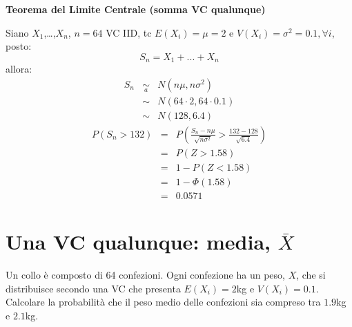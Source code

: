 \documentclass[
  11pt,
]{book}
\theoremstyle{mytheoremstyle}
\theoremstyle{mydefstyle}
\newenvironment{sol}
  {
  \begin{tcolorbox}[enhanced,breakable,arc=0.1mm,boxrule=1pt,colback=white,colframe=iblue,
  title=\bf \fontfamily{lmss}\selectfont \hspace{.5 cm} Soluzione,drop fuzzy shadow]

}{
\end{tcolorbox}
  }
\begin{document}
\begin{sol}

\textbf{Teorema del Limite Centrale (somma VC qualunque)}

Siano \(X_1\),\ldots,\(X_n\), \(n=64\) VC IID, tc \(E(X_i)=\mu=2\) e \(V(X_i)=\sigma^2=0.1,\forall i\), posto:
\[
      S_n = X_1 + ... + X_n
      \]
allora:\begin{eqnarray*}
  S_n & \mathop{\sim}\limits_{a}& N(n\mu,n\sigma^2) \\
     &\sim & N(64\cdot2,64\cdot0.1) \\
     &\sim & N(128,6.4) 
  \end{eqnarray*}\begin{eqnarray*}
      P( S_n   >   132 ) 
        &=& P\left(  \frac { S_n  -  n\mu }{ \sqrt{n\sigma^2} }  >  \frac { 132  -  128 }{\sqrt{ 6.4 }} \right)  \\
                 &=& P\left(  Z   >   1.58 \right) \\    &=& 1-P(Z< 1.58 )\\ 
                 &=&  1-\Phi( 1.58 ) \\ &=&  0.0571 
      \end{eqnarray*}

\end{sol}

\section{\texorpdfstring{Una VC qualunque: media, \(\bar{X}\)}{Una VC qualunque: media, \textbackslash bar\{X\}}}\label{una-vc-qualunque-media-barx}

Un collo è composto di 64 confezioni. Ogni confezione ha un peso, \(X\),
che si distribuisce secondo una VC che presenta \(E(X_{i})= 2\)kg e
\(V(X_{i})=0.1\). Calcolare la probabilità che il peso medio delle
confezioni sia compreso tra \(1.9\)kg e \(2.1\)kg.
\end{document}
